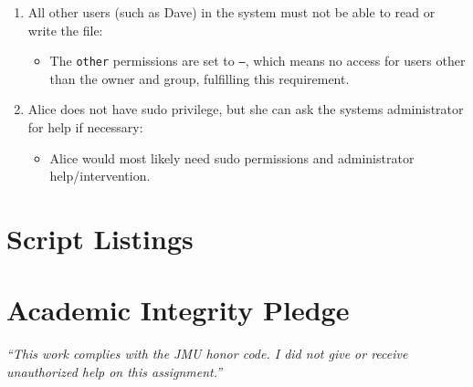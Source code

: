 \documentclass{article}
\begin{document}
\begin{enumerate}
    \item All other users (such as Dave) in the system must not be able to read or write the file:
    \begin{itemize}
        \item The \texttt{other} permissions are set to \texttt{---}, which means no access for users other than the owner and group, fulfilling this requirement.
    \end{itemize}
    
    \item Alice does not have sudo privilege, but she can ask the systems administrator for help if necessary:
    \begin{itemize}
        \item Alice would most likely need sudo permissions and administrator help/intervention. 
    \end{itemize}
\end{enumerate}

\section*{Script Listings}
%


\vfill
  \section*{Academic Integrity Pledge}
    {\color{red}\textit{“This work complies with the JMU honor code. I did not give or receive unauthorized help on this assignment.”}}
\end{document}
